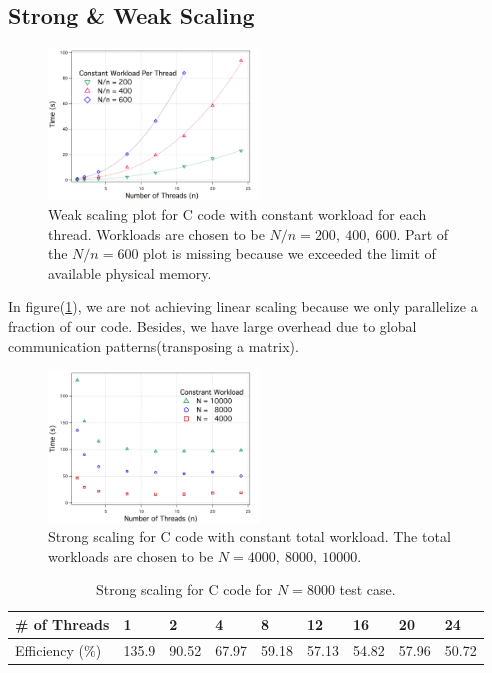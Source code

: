 \documentclass[a4paper,11pt]{article}
\begin{document}
	\subsection{Strong \& Weak Scaling}
	\begin{figure}[H]
        \centering
                \includegraphics[width=0.5\textwidth]{weak_scaling.jpg}
                \caption {Weak scaling plot for C code with constant workload for each thread. Workloads are chosen to be $N/n = 200,~400, ~600$. Part of the $N/n = 600$ plot is missing because we exceeded the limit of available physical memory.}
                \label{weak}
	\end{figure}
	In figure(\ref{weak}), we are not achieving linear scaling because we only parallelize a fraction of our code. Besides, we have large overhead due to global communication patterns(transposing a matrix). 
	\begin{figure}[H]
        \centering
                \includegraphics[width=0.5\textwidth]{strong_scaling.jpg}
                \caption {Strong scaling for C code with constant total workload. The total workloads are chosen to be $N = 4000,~8000,~10000$.}
                \label{strong}
	\end{figure}
	\begin{table}[H]
	\centering
	\label{my-label}
	\begin{tabular}{l|llllllll}
	\# of Threads   & 1     & 2     & 4     & 8     & 12    & 16    & 20    & 24    \\\hline
	Efficiency (\%) & 135.9 & 90.52 & 67.97 & 59.18 & 57.13 & 54.82 & 57.96 & 50.72
	\end{tabular}
	\caption{Strong scaling for C code for $N = 8000$ test case.}
	\end{table}
\end{document}
